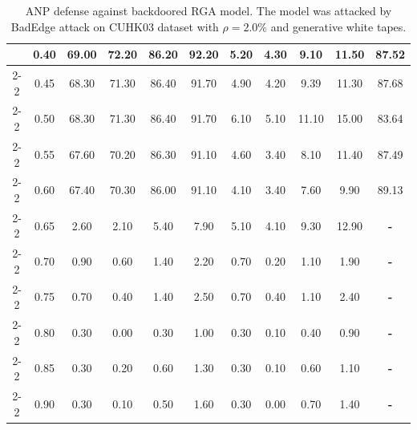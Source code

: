 \begin{table}[htbp]
\begin{minipage}[b]{0.53\linewidth}
{\begin{tabular}{ccccccccccc}
\multicolumn{1}{c|}{} & \multicolumn{1}{c|}{0.40} & 69.00 & 72.20 & 86.20 & \multicolumn{1}{c|}{92.20} & 5.20 & 4.30 & 9.10 & 11.50 & 87.52 \\ \cline{2-2}
\multicolumn{1}{c|}{} & \multicolumn{1}{c|}{0.45} & 68.30 & 71.30 & 86.40 & \multicolumn{1}{c|}{91.70} & 4.90 & 4.20 & 9.39 & 11.30 & 87.68 \\ \cline{2-2}
\multicolumn{1}{c|}{} & \multicolumn{1}{c|}{0.50} & 68.30 & 71.30 & 86.40 & \multicolumn{1}{c|}{91.70} & 6.10 & 5.10 & 11.10 & 15.00 & 83.64 \\ \cline{2-2}
\multicolumn{1}{c|}{} & \multicolumn{1}{c|}{0.55} & 67.60 & 70.20 & 86.30 & \multicolumn{1}{c|}{91.10} & 4.60 & 3.40 & 8.10 & 11.40 & 87.49 \\ \cline{2-2}
\multicolumn{1}{c|}{} & \multicolumn{1}{c|}{0.60} & 67.40  & 70.30  & 86.00 & \multicolumn{1}{c|}{91.10} & 4.10  & 3.40  & 7.60 & 9.90 & 89.13 \\ \cline{2-2}
\multicolumn{1}{c|}{} & \multicolumn{1}{c|}{0.65} & 2.60  & 2.10  & 5.40  & \multicolumn{1}{c|}{7.90}  & 5.10  & 4.10  & 9.30  & 12.90  & \textbf{-}  \\ \cline{2-2}
\multicolumn{1}{c|}{} & \multicolumn{1}{c|}{0.70} & 0.90  & 0.60  & 1.40  & \multicolumn{1}{c|}{2.20}  & 0.70  & 0.20  & 1.10  & 1.90 & \textbf{-}   \\ \cline{2-2}
\multicolumn{1}{c|}{} & \multicolumn{1}{c|}{0.75} & 0.70  & 0.40  & 1.40  & \multicolumn{1}{c|}{2.50}  & 0.70  & 0.40  & 1.10  & 2.40 & \textbf{-}   \\ \cline{2-2}
\multicolumn{1}{c|}{} & \multicolumn{1}{c|}{0.80} & 0.30  & 0.00  & 0.30  & \multicolumn{1}{c|}{1.00}  & 0.30  & 0.10  & 0.40  & 0.90 & \textbf{-}   \\ \cline{2-2}
\multicolumn{1}{c|}{} & \multicolumn{1}{c|}{0.85} & 0.30  & 0.20  & 0.60  & \multicolumn{1}{c|}{1.30}  & 0.30  & 0.10  & 0.60  & 1.10 & \textbf{-}   \\ \cline{2-2}
\multicolumn{1}{c|}{} & \multicolumn{1}{c|}{0.90} & 0.30  & 0.10  & 0.50  & \multicolumn{1}{c|}{1.60}  & 0.30  & 0.00  & 0.70  & 1.40 & \textbf{-}   \\ \bottomrule
\end{tabular}}
  \caption{ANP defense against backdoored RGA model. The model was attacked by BadEdge attack on CUHK03 dataset with $\rho=2.0\%$ and generative white tapes.}
  \label{tab:ANP}
\end{minipage}
\end{table}